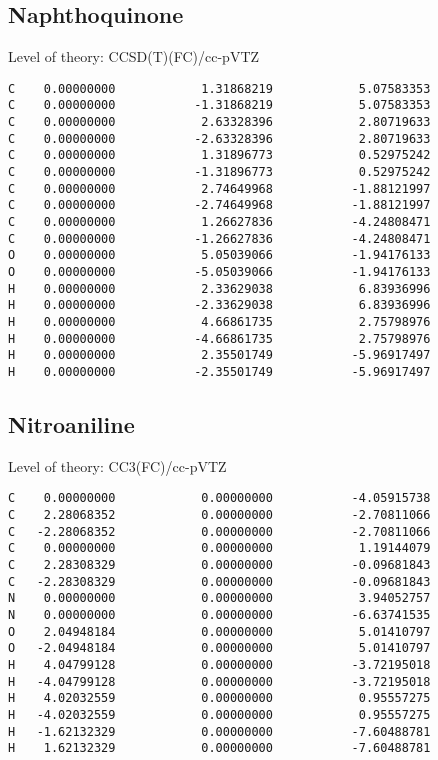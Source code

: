 \documentclass[journal=jctcce,manuscript=article,layout=traditional]{achemso}
\newcommand{\TZ}{cc-pVTZ}
\begin{document}
\subsection*{Naphthoquinone}

\begin{singlespace}
Level of theory: CCSD(T)(FC)/{\TZ}
\begin{verbatim}
C    0.00000000            1.31868219            5.07583353
C    0.00000000           -1.31868219            5.07583353
C    0.00000000            2.63328396            2.80719633
C    0.00000000           -2.63328396            2.80719633
C    0.00000000            1.31896773            0.52975242
C    0.00000000           -1.31896773            0.52975242
C    0.00000000            2.74649968           -1.88121997
C    0.00000000           -2.74649968           -1.88121997
C    0.00000000            1.26627836           -4.24808471
C    0.00000000           -1.26627836           -4.24808471
O    0.00000000            5.05039066           -1.94176133
O    0.00000000           -5.05039066           -1.94176133
H    0.00000000            2.33629038            6.83936996
H    0.00000000           -2.33629038            6.83936996
H    0.00000000            4.66861735            2.75798976
H    0.00000000           -4.66861735            2.75798976
H    0.00000000            2.35501749           -5.96917497
H    0.00000000           -2.35501749           -5.96917497
\end{verbatim}
\end{singlespace}

\subsection*{Nitroaniline}

\begin{singlespace}
Level of theory: CC3(FC)/{\TZ}
\begin{verbatim}
C    0.00000000            0.00000000           -4.05915738
C    2.28068352            0.00000000           -2.70811066
C   -2.28068352            0.00000000           -2.70811066
C    0.00000000            0.00000000            1.19144079
C    2.28308329            0.00000000           -0.09681843
C   -2.28308329            0.00000000           -0.09681843
N    0.00000000            0.00000000            3.94052757
N    0.00000000            0.00000000           -6.63741535
O    2.04948184            0.00000000            5.01410797
O   -2.04948184            0.00000000            5.01410797
H    4.04799128            0.00000000           -3.72195018
H   -4.04799128            0.00000000           -3.72195018
H    4.02032559            0.00000000            0.95557275
H   -4.02032559            0.00000000            0.95557275
H   -1.62132329            0.00000000           -7.60488781
H    1.62132329            0.00000000           -7.60488781
\end{verbatim}
\end{singlespace}
\end{document}
